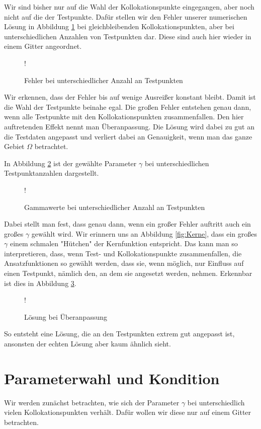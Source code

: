 Wir sind bisher nur auf die Wahl der Kollokationspunkte eingegangen, aber noch nicht auf die der Testpunkte. Dafür stellen wir den Fehler unserer numerischen Lösung in Abbildung \ref{fig:testpunkte} bei gleichbleibenden Kollokationspunkten, aber bei unterschiedlichen Anzahlen von Testpunkten dar. Diese sind auch hier wieder in einem Gitter angeordnet.
\begin{figure}[H]
\centering
\resizebox {\columnwidth} {!} {

}
\caption{Fehler bei unterschiedlicher Anzahl an Testpunkten}
\label{fig:testpunkte}
\end{figure}
Wir erkennen, dass der Fehler bis auf wenige Ausreißer konstant bleibt. Damit ist die Wahl der Testpunkte beinahe egal. Die großen Fehler entstehen genau dann, wenn alle Testpunkte mit den Kollokationspunkten zusammenfallen. Den hier auftretenden Effekt nennt man Überanpassung. Die Lösung wird dabei zu gut an die Testdaten angepasst und verliert dabei an Genauigkeit, wenn man das ganze Gebiet $\Omega$ betrachtet. 

In Abbildung \ref{fig:testpunkte-gamma} ist der gewählte Parameter $\gamma$ bei unterschiedlichen Testpunktanzahlen dargestellt.
\begin{figure}[ht]
\centering
\resizebox {\columnwidth} {!} {

}
\caption{Gammawerte bei unterschiedlicher Anzahl an Testpunkten}
\label{fig:testpunkte-gamma}
\end{figure}
Dabei stellt man fest, dass genau dann, wenn ein großer Fehler auftritt auch ein großes $\gamma$ gewählt wird. Wir erinnern uns an Abbildung \ref{fig:Kerne}, dass ein großes $\gamma$ einem schmalen "Hütchen"  der Kernfunktion entspricht. Das kann man so interpretieren, dass, wenn Test- und Kollokationspunkte zusammenfallen, die Ansatzfunktionen so gewählt werden, dass sie, wenn möglich, nur Einfluss auf einen Testpunkt, nämlich den, an dem sie angesetzt werden, nehmen. Erkennbar ist dies in Abbildung \ref{fig:overfitting}.
\begin{figure}[ht]
\centering
\resizebox {\columnwidth} {!} {

}
\caption{Lösung bei Überanpassung}
\label{fig:overfitting}
\end{figure}

So entsteht eine Lösung, die an den Testpunkten extrem gut angepasst ist, ansonsten der echten Lösung aber kaum ähnlich sieht.
\section{Parameterwahl und Kondition}
Wir werden zunächst betrachten, wie sich der Parameter $\gamma$ bei unterschiedlich vielen Kollokationspunkten verhält. Dafür wollen wir diese nur auf einem Gitter betrachten.
